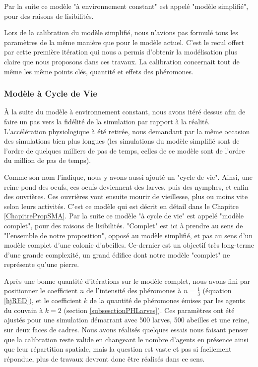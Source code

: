 			Par la suite ce modèle "à environnement constant" est appelé "modèle simplifié", pour des raisons de lisibilités.
			
			Lors de la calibration du modèle simplifié, nous n'avions pas formulé tous les paramètres de la même manière que pour le modèle actuel. C'est le recul offert par cette première itération qui nous a permis d'obtenir la modélisation plus claire que nous proposons dans ces travaux. La calibration concernait tout de même les même points clés, quantité et effets des phéromones.
			
			
			\subsubsection{Modèle à Cycle de Vie}
			À la suite du modèle à environnement constant, nous avons itéré dessus afin de faire un pas vers la fidélité de la simulation par rapport à la réalité. L'accélération physiologique à été retirée, nous demandant par la même occasion des simulations bien plus longues (les simulations du modèle simplifié sont de l'ordre de quelques milliers de pas de temps, celles de ce modèle sont de l'ordre du million de pas de temps).
			
			Comme son nom l'indique, nous y avons aussi ajouté un "cycle de vie". Ainsi, une reine pond des oeufs, ces oeufs deviennent des larves, puis des nymphes, et enfin des ouvrières. Ces ouvrières vont ensuite mourir de vieillesse, plus ou moins vite selon leurs activités. C'est ce modèle qui est décrit en détail dans le Chapitre \ref{ChapitrePropSMA}.
			Par la suite ce modèle "à cycle de vie" est appelé "modèle complet", pour des raisons de lisibilités. "Complet" est ici à prendre au sens de "l'ensemble de notre proposition", opposé au modèle simplifié, et pas au sens d'un modèle complet d'une colonie d'abeilles. Ce-dernier est un objectif très long-terme d'une grande complexité, un grand édifice dont notre modèle "complet" ne représente qu'une pierre.
			
			Après une bonne quantité d'itérations sur le modèle complet, nous avons fini par positionner le coefficient $n$ de l'intensité des phéromones à $n = \frac{1}{3}$ (équation \ref{hjRED}), et le coefficient $k$ de la quantité de phéromones émises par les agents du couvain à $k=2$ (section \ref{subsesctionPHLarves}). Ces paramètres ont été ajustés pour une simulation démarrant avec 500 larves, 500 abeilles et une reine, sur deux faces de cadres. Nous avons réalisés quelques essais nous faisant penser que la calibration reste valide en changeant le nombre d'agents en présence ainsi que leur répartition spatiale, mais la question est vaste et pas si facilement répondue, plus de travaux devront donc être réalisés dans ce sens.
		
